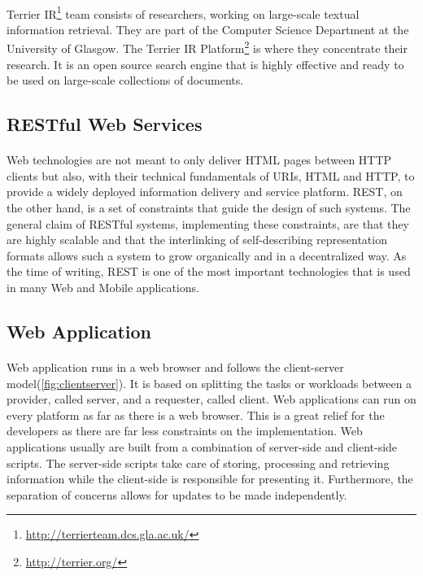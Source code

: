 \documentclass{l4proj}
\begin{document}
\paragraph{}
Terrier IR\footnote{\url{http://terrierteam.dcs.gla.ac.uk/}} team consists of researchers, working on large-scale textual information retrieval. They are part of the Computer Science Department at the University of Glasgow. The Terrier IR Platform\footnote{\url{http://terrier.org/}} is where they concentrate their research. It is an open source search engine that is highly effective and ready to be used on large-scale collections of documents. 

\subsection{RESTful Web Services}
\paragraph{}
Web technologies are not meant to only deliver HTML pages between HTTP clients but also, with their technical fundamentals of URIs, HTML and HTTP, to provide a widely deployed information delivery and service platform. REST, on the other hand, is a set of constraints that guide the design of such systems. The general claim of RESTful systems, implementing these constraints, are that they are highly scalable and that the interlinking of self-describing representation formats allows such a system to grow organically and in a decentralized way\cite{restful}. As the time of writing, REST is one of the most important technologies that is used in many Web and Mobile applications.

\subsection{Web Application}
\paragraph{}
Web application runs in a web browser and follows the client-server model(\ref{fig:clientserver}). It is based on splitting the tasks or workloads between a provider, called server, and a requester, called client. Web applications can run on every platform as far as there is a web browser. This is a great relief for the developers as there are far less constraints on the implementation. Web applications usually are built from a combination of  server-side and client-side scripts. The server-side scripts take care of storing, processing and retrieving information while the client-side is responsible for presenting it. Furthermore, the separation of concerns allows for updates to be made independently.    
\end{document}
